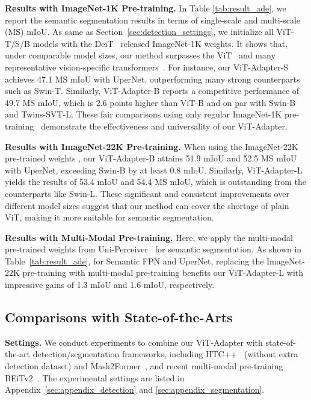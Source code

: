 \documentclass{article} \usepackage{iclr2023_conference,times}
\begin{document}
\vspace{-1em}
\noindent \textbf{Results with ImageNet-1K Pre-training.} 
In Table \ref{tab:result_ade}, we report the semantic segmentation results in terms of single-scale and multi-scale (MS) mIoU.
As same as Section~\ref{sec:detection_settings}, we initialize all ViT-T/S/B models with the DeiT~\citep{touvron2021training} released ImageNet-1K weights.
It shows that, under comparable model sizes, our method surpasses the ViT~\citep{li2021benchmarking} and many representative vision-specific transformers~\citep{wang2021pyramid,wang2021pvtv2,liu2021swin,chu2021twins}.
For instance, our ViT-Adapter-S achieves 47.1 MS mIoU with UperNet, outperforming many strong counterparts such as Swin-T.
Similarly, ViT-Adapter-B reports a competitive performance of 49.7 MS mIoU, which is 2.6 points higher than ViT-B and on par with Swin-B and Twins-SVT-L.
These fair comparisons using only regular ImageNet-1K pre-training~\citep{touvron2021training} demonstrate the effectiveness and universality of our ViT-Adapter.




\noindent \textbf{Results with ImageNet-22K Pre-training.} 
When using the ImageNet-22K pre-trained weights \citep{steiner2021train}, our ViT-Adapter-B attains 51.9 mIoU and 52.5 MS mIoU with UperNet, exceeding Swin-B by at least 0.8 mIoU.
Similarly, 
ViT-Adapter-L yields the results of 53.4 mIoU and 54.4 MS mIoU, which is outstanding from the counterparts like Swin-L.
These significant and consistent improvements over different model sizes suggest that our method can cover the shortage of plain ViT, making it more suitable for semantic segmentation.

\noindent \textbf{Results with Multi-Modal Pre-training.} 
Here, we apply the multi-modal pre-trained weights from Uni-Perceiver~\citep{zhu2021uni} for semantic segmentation. 
As shown in Table~\ref{tab:result_ade}, for Semantic FPN and UperNet, replacing the ImageNet-22K pre-training with multi-modal pre-training benefits our ViT-Adapter-L with impressive gains of 1.3 mIoU and 1.6 mIoU, respectively.






\vspace{-0.5em}
\subsection{Comparisons with State-of-the-Arts}

\noindent\textbf{Settings.}
We conduct experiments to combine our ViT-Adapter with state-of-the-art detection/segmentation frameworks, including HTC++~\citep{liu2021swin} (without extra detection dataset) and Mask2Former~\citep{cheng2021masked}, and recent multi-modal pre-training BEiTv2~\citep{peng2022beitv2}. 
The experimental settings are listed in Appendix~\ref{sec:appendix_detection} and \ref{sec:appendix_segmentation}.
 
\end{document}

